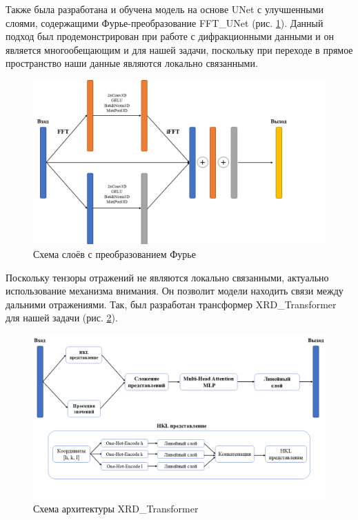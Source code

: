 Также была разработана и обучена модель на основе UNet с улучшенными слоями, содержащими Фурье-преобразование FFT\_UNet (рис. \ref{fft_unet}). Данный подход был продемонстрирован \cite{yang_hionet_2023} при работе с дифракционными данными и он является многообещающим и для нашей задачи, поскольку при переходе в прямое пространство наши данные являются локально связанными.


\begin{figure}[H]
    \centering
    \includegraphics[width=1\textwidth]{figures/fft_arch.jpg}
    \caption{Схема слоёв с преобразованием Фурье}
    \label{fft_unet}
\end{figure}

Поскольку тензоры отражений не являются локально связанными, актуально использование механизма внимания. Он позволит модели находить связи между дальними отражениями. Так, был разработан трансформер XRD\_Transformer для нашей задачи (рис. \ref{XRDTrans}). 

\begin{figure}[H]
    \centering
    \includegraphics[width=1\textwidth]{figures/xrd_arch.png}
    \caption{Схема архитектуры XRD\_Transformer}
    \label{XRDTrans}
\end{figure}

